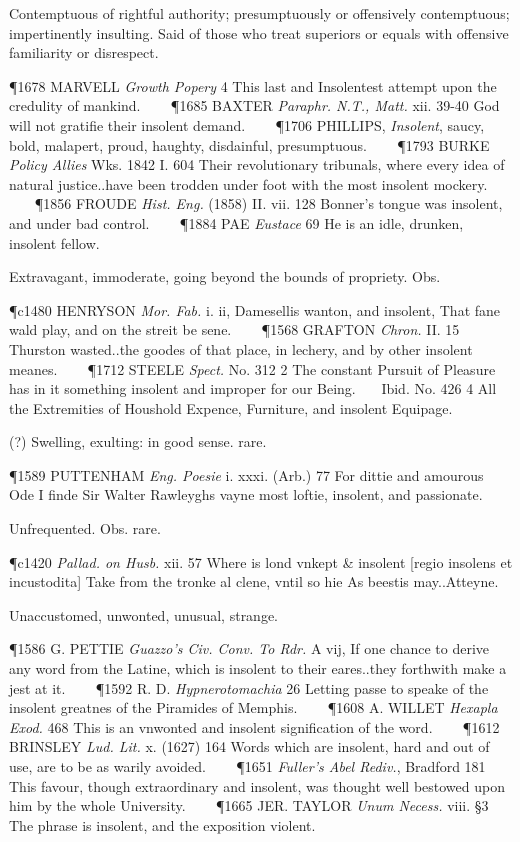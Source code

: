 \begin{description}[wide, labelwidth=!, labelindent=0pt]
\begin{myenumerate}
 Contemptuous of rightful authority; presumptuously or offensively contemptuous; impertinently insulting. Said of those who treat superiors or equals with offensive familiarity or disrespect.

\P 1678 MARVELL  \textit{Growth Popery} 4 This last and Insolentest attempt upon the credulity of mankind.    
\P 1685 BAXTER  \textit{Paraphr. N.T., Matt.} xii. 39-40 God will not gratifie their insolent demand.    
\P 1706 PHILLIPS,  \textit{Insolent}, saucy, bold, malapert, proud, haughty, disdainful, presumptuous.    
\P 1793 BURKE  \textit{Policy Allies} Wks. 1842 I. 604  Their revolutionary tribunals, where every idea of natural justice..have been trodden under foot with the most insolent mockery.    
\P 1856 FROUDE  \textit{Hist. Eng.} (1858) II. vii. 128 Bonner's tongue was insolent, and under bad control.    
\P 1884 PAE  \textit{Eustace} 69 He is an idle, drunken, insolent fellow.

 Extravagant, immoderate, going beyond the bounds of propriety. Obs.

\P c1480 HENRYSON  \textit{Mor. Fab.} i. ii, Damesellis wanton, and insolent, That fane wald play, and on the streit be sene.    
\P 1568 GRAFTON  \textit{Chron.} II. 15 Thurston wasted..the goodes of that place, in lechery, and by other insolent meanes.    
\P 1712 STEELE  \textit{Spect.} No. 312 2 The constant Pursuit of Pleasure has in it something insolent and improper for our Being.    Ibid. No. 426 4 All the Extremities of Houshold Expence, Furniture, and insolent Equipage.

 (?) Swelling, exulting: in good sense. rare.

\P 1589 PUTTENHAM  \textit{Eng. Poesie} i. xxxi. (Arb.) 77 For dittie and amourous Ode I finde Sir Walter Rawleyghs vayne most loftie, insolent, and passionate.

  Unfrequented. Obs. rare.

\P c1420  \textit{Pallad. on Husb.} xii. 57 Where is lond vnkept \& insolent [regio insolens et incustodita] Take from the tronke al clene, vntil so hie As beestis may..Atteyne.

 Unaccustomed, unwonted, unusual, strange.

\P 1586 G. PETTIE  \textit{Guazzo's Civ. Conv. To Rdr.} A vij, If one chance to derive any word from the Latine, which is insolent to their eares..they forthwith make a jest at it.    
\P 1592 R. D. \textit{Hypnerotomachia}  26 Letting passe to speake of the insolent greatnes of the Piramides of Memphis.    
\P 1608 A. WILLET  \textit{Hexapla Exod.} 468 This is an vnwonted and insolent signification of the word.    
\P 1612 BRINSLEY  \textit{Lud. Lit.} x. (1627) 164 Words which are insolent, hard and out of use, are to be as warily avoided.    
\P 1651 \textit{Fuller's  Abel Rediv.}, Bradford 181 This favour, though extraordinary and insolent, was thought well bestowed upon him by the whole University.    
\P 1665 JER. TAYLOR  \textit{Unum Necess.} viii. §3 The phrase is insolent, and the exposition violent.


\end{myenumerate}
\end{description}
